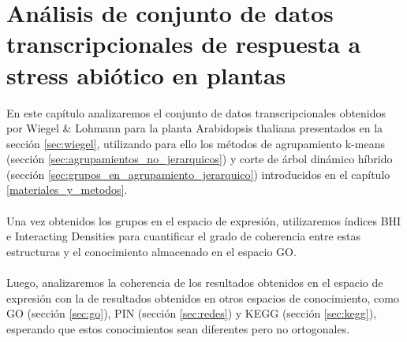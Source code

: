 \chapter{Análisis de conjunto de datos transcripcionales de respuesta a stress abiótico en plantas}
En este capítulo analizaremos el conjunto de datos transcripcionales obtenidos por Wiegel \& Lohmann para la planta Arabidopsis thaliana presentados en la sección \ref{sec:wiegel}, utilizando para ello los métodos de agrupamiento k-means (sección \ref{sec:agrupamientos_no_jerarquicos}) y corte de árbol dinámico híbrido (sección \ref{sec:grupos_en_agrupamiento_jerarquico}) introducidos en el capítulo \ref{materiales_y_metodos}.\\\\
Una vez obtenidos los grupos en el espacio de expresión, utilizaremos índices BHI e Interacting Densities para cuantificar el grado de coherencia entre estas estructuras y el conocimiento almacenado en el espacio GO.\\\\
Luego, analizaremos la coherencia de los resultados obtenidos en el espacio de expresión con la de resultados obtenidos en otros espacios de conocimiento, como GO (sección \ref{sec:go}), PIN  (sección \ref{sec:redes}) y KEGG (sección \ref{sec:kegg}), esperando que estos conocimientos sean diferentes pero no ortogonales. 

